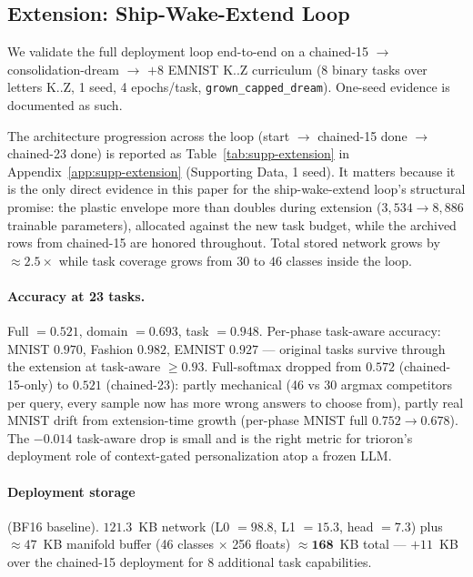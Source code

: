 \documentclass[11pt]{article}
\newcommand{\arm}[1]{\texttt{#1}}
\begin{document}
\subsection{Extension: Ship-Wake-Extend Loop}
\label{sec:extension-results}

We validate the full deployment loop end-to-end on a chained-15 $\to$
consolidation-dream $\to$ $+8$ EMNIST K..Z curriculum (8 binary tasks
over letters K..Z, 1 seed, 4 epochs/task,
\arm{grown\_capped\_dream}). One-seed evidence is documented as such.

The architecture progression across the loop (start $\to$ chained-15
done $\to$ chained-23 done) is reported as
Table~\ref{tab:supp-extension} in
Appendix~\ref{app:supp-extension} (Supporting Data, 1 seed). It
matters because it is the only direct evidence in this paper for the
ship-wake-extend loop's structural promise: the plastic envelope
more than doubles during extension ($3{,}534 \to 8{,}886$ trainable
parameters), allocated against the new task budget, while the
archived rows from chained-15 are honored throughout. Total stored
network grows by $\approx 2.5\times$ while task coverage grows from
$30$ to $46$ classes inside the loop.

\paragraph{Accuracy at 23 tasks.}
Full $= 0.521$, domain $= 0.693$, task $= 0.948$. Per-phase task-aware
accuracy: MNIST $0.970$, Fashion $0.982$, EMNIST $0.927$ --- original
tasks survive through the extension at task-aware $\geq 0.93$.
Full-softmax dropped from $0.572$ (chained-15-only) to $0.521$
(chained-23): partly mechanical (46 vs 30 argmax competitors per
query, every sample now has more wrong answers to choose from),
partly real MNIST drift from extension-time growth (per-phase MNIST
full $0.752 \to 0.678$). The $-0.014$ task-aware drop is small and
is the right metric for trioron's deployment role of context-gated
personalization atop a frozen LLM.

\paragraph{Deployment storage} (BF16 baseline).
$121.3$~KB network (L0 $= 98.8$, L1 $= 15.3$, head $= 7.3$) plus
$\approx\!47$~KB manifold buffer (46 classes $\times$ 256 floats)
$\approx \mathbf{168}$~KB total --- $+11$~KB over the chained-15
deployment for 8 additional task capabilities.
\end{document}
